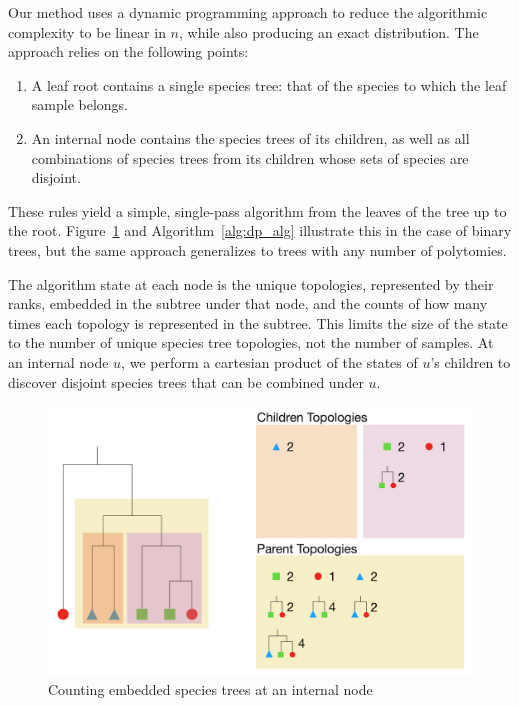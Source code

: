 \documentclass{article}
\begin{document}
Our method uses a dynamic programming approach to reduce the algorithmic
complexity to be linear in $n$, while also producing an exact distribution.
The approach relies on the following points:
\begin{enumerate}
    \item A leaf root contains a single species tree: that of the species to
        which the leaf sample belongs.
    \item An internal node contains the species trees of its children, as
        well as all combinations of species trees from its children whose
        sets of species are disjoint.
\end{enumerate}
These rules yield a simple, single-pass algorithm from the leaves of the tree
up to the root. Figure~\ref{fig:dp_alg} and Algorithm~\ref{alg:dp_alg}
illustrate this in the case of binary trees, but the same approach generalizes
to trees with any number of polytomies.

The algorithm state at each node is the unique topologies,
represented by their ranks, embedded in the subtree under that node, and the
counts of how many times each topology is represented in the subtree. This
limits the size of the state to the number of unique species tree topologies,
not the number of samples. At an internal node $u$, we perform a cartesian
product of the states of $u$'s children to discover disjoint species trees that
can be combined under $u$.

\begin{figure}[H]
    \includegraphics[scale=0.5]{dp_alg}
    \centering
    \caption{Counting embedded species trees at an internal node}
    \label{fig:dp_alg}
\end{figure}
\end{document}

